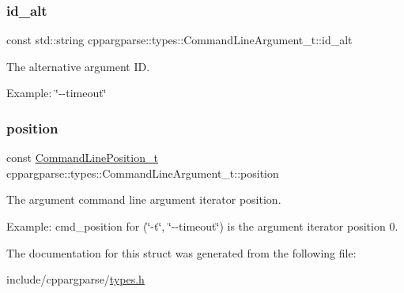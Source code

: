\subsubsection{\texorpdfstring{id\+\_\+alt}{id\_alt}}
{\footnotesize\ttfamily const std\+::string cppargparse\+::types\+::\+Command\+Line\+Argument\+\_\+t\+::id\+\_\+alt}



The alternative argument ID. 

Example\+: \char`\"{}-\/-\/timeout\char`\"{} \mbox{\label{structcppargparse_1_1types_1_1CommandLineArgument__t_a942c3909aa9951e8e06fa2b3aaa77054}} 
\subsubsection{\texorpdfstring{position}{position}}
{\footnotesize\ttfamily const \hyperlink{types_8h_a43b4f43f8940de1bf09ced6f1b668053}{Command\+Line\+Position\+\_\+t} cppargparse\+::types\+::\+Command\+Line\+Argument\+\_\+t\+::position}



The argument command line argument iterator position. 

Example\+: cmd\+\_\+position for (\char`\"{}-\/t\char`\"{}, \char`\"{}-\/-\/timeout\char`\"{}) is the argument iterator position 0. 

The documentation for this struct was generated from the following file\+:\begin{DoxyCompactItemize}
\item 
include/cppargparse/\hyperlink{types_8h}{types.\+h}\end{DoxyCompactItemize}
